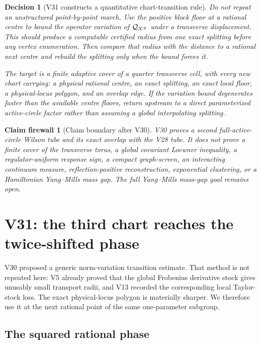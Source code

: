 \documentclass[11pt,oneside]{article}
\newtheorem{firewall}[theorem]{Claim firewall}
\newtheorem{decision}[theorem]{Decision}
\theoremstyle{definition}
\theoremstyle{remark}
\begin{document}
\begin{decision}[V31 constructs a quantitative chart-transition rule]
\label{dec:newv30-next}
Do not repeat an unstructured point-by-point march.  Use the positive
block floor at a rational centre to bound the operator variation of
\({\cal Q}_{X^\#}\) under a transverse displacement.  This should
produce a computable certified radius from one exact splitting before
any vertex enumeration.  Then compare that radius with the distance
to a rational next centre and rebuild the splitting only when the
bound forces it.

The target is a finite adaptive cover of a quarter transverse cell,
with every new chart carrying: a physical rational centre, an exact
splitting, an exact local floor, a physical-locus polygon, and an
overlap edge.  If the variation bound degenerates faster than the
available centre floors, return upstream to a direct parameterized
active-circle factor rather than assuming a global interpolating
splitting.
\end{decision}

\begin{firewall}[Claim boundary after V30]
\label{fire:newv30-final}
V30 proves a second full-active-circle Wilson tube and its exact
overlap with the V28 tube.  It does not prove a finite cover of the
transverse torus, a global covariant Loewner inequality, a
regulator-uniform response sign, a compact graph-screen, an
interacting continuum measure, reflection-positive reconstruction,
exponential clustering, or a Hamiltonian Yang--Mills mass gap.
The full Yang--Mills mass-gap goal remains open.
\end{firewall}

\section{V31: the third chart reaches the twice-shifted phase}
\label{sec:newv31-third-tube}

V30 proposed a generic norm-variation transition estimate.  That
method is not repeated here: V5 already proved that the global
Frobenius derivative stock gives unusably small transport radii, and
V13 recorded the corresponding local Taylor-stock loss.  The exact
physical-locus polygon is materially sharper.  We therefore use it
at the next rational point of the same one-parameter subgroup.

\subsection{The squared rational phase}
\end{document}
